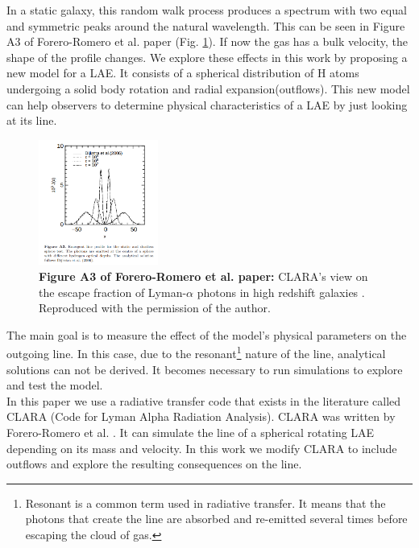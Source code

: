 \documentclass[twocolappendix]{latex/emulateapj}
\begin{document}
In a static galaxy, this random walk process produces a spectrum with two equal and symmetric peaks around the natural \lya wavelength. This can be seen in Figure A3 of Forero-Romero et al. paper \cite{CLARA} (Fig. \ref{fig:static}). If now the gas has a bulk velocity, the shape of the \lya profile changes. We explore these effects in this work by proposing a new model for a LAE. It consists of a spherical distribution of H atoms undergoing a solid body rotation and radial expansion(outflows). This new model can help observers to determine physical characteristics of a LAE by just looking at its \lya line. \\

\begin{figure}[h!]
	\begin{center}
		\includegraphics[width=0.35\textwidth]{./figures/static}
	\end{center}
	\caption{\textbf{Figure A3 of Forero-Romero et al. paper:} CLARA's view on the escape fraction of Lyman-$\alpha$ photons in high redshift galaxies \cite{CLARA}. Reproduced with the permission of the author.
		\label{fig:static}}
\end{figure}

The main goal is to measure the effect of the model's physical parameters on the outgoing \lya line. In this case, due to the resonant\footnote{Resonant is a common term used in radiative transfer. It means that the photons that create the line are absorbed and re-emitted several times before escaping the cloud of gas.} nature of the \lya line, analytical solutions can not be derived. It becomes necessary to run simulations to explore and test the model. \\

In this paper we use a radiative transfer code that exists in the literature called CLARA (Code for Lyman Alpha Radiation Analysis). CLARA was written by Forero-Romero et al. \cite{CLARA}. It can simulate the \lya line of a spherical rotating LAE depending on its mass and velocity. In this work we modify CLARA to include outflows and explore the resulting consequences on the \lya line. \\
\end{document}
